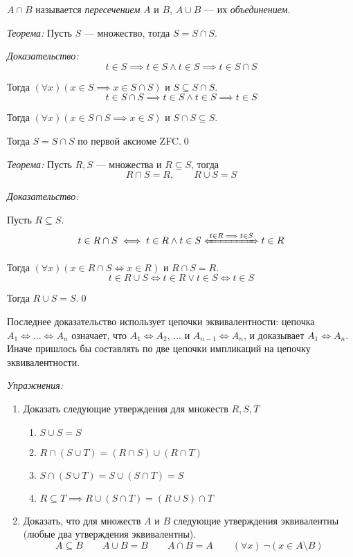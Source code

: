 $A\cap B$ называется {\it пересечением} $A$ и $B$,
$A\cup B$ --- их {\it объединением}.

\vspace{1em}
{\it Теорема:} Пусть $S$ --- множество, тогда $S=S\cap S$.

	{\it Доказательство:}
\[
	t\in S\implies t\in S\land t\in S\implies t\in S\cap S
\]

Тогда $(\forall x)(x\in S\implies x\in S\cap S)$ и $S\subseteq S\cap S$.
\[
	t\in S\cap S\implies t\in S\land t\in S\implies t\in S
\]

Тогда $(\forall x)(x\in S\cap S\implies x\in S)$ и $S\cap S\subseteq S$.

Тогда $S=S\cap S$ по первой аксиоме ZFC.\qed

\vspace{1em}
{\it Теорема:} Пусть $R,S$ --- множества и $R\subseteq S$, тогда
\[
	R\cap S= R,\qquad R\cup S= S
\]

{\it Доказательство:}

Пусть $R\subseteq S$.
\[
	t\in R\cap S\iff t\in R\land t\in S\xLeftrightarrow{t\in R\implies t\in S} t\in R
\]

Тогда $(\forall x)(x\in R\cap S\iff x\in R)$ и $R\cap S=R$.
\[
	t\in R\cup S\iff t\in R\lor t\in S\iff t\in S
\]

Тогда $R\cup S=S$.\qed

Последнее доказательство использует цепочки эквивалентности:
цепочка $A_1\iff...\iff A_{n}$ означает, что $A_1\iff A_2$, ... и
$A_{n-1}\iff A_{n}$, и доказывает $A_1\iff A_{n}$. Иначе пришлось
бы составлять по две цепочки импликаций на цепочку эквивалентности.

\newcommand\eset{\varnothing}
{\it Упражнения:}
\begin{enumerate}
	\item{}Доказать следующие утверждения для множеств $R,S,T$
	\begin{fullwidth}
		\begin{multicols}{2}
			\begin{enumerate}
				\item{}$S\cup S=S$
				\item{}$R\cap (S\cup T)=(R\cap S)\cup (R\cap T)$
				\item{}$S\cap (S\cup T)=S\cup (S\cap T)=S$
				\item{}$R\subseteq T\implies R\cup (S\cap T)=(R\cup S)\cap T$
			\end{enumerate}
		\end{multicols}
	\end{fullwidth}

	\item{}Доказать, что для множеств $A$ и $B$ следующие утверждения эквивалентны
	(любые два утверждения эквивалентны).
	\[
		A\subseteq B\qquad A\cup B=B\qquad A\cap B=A
		\qquad (\forall x)~\lnot(x\in A\setminus B)
	\]
\end{enumerate}

